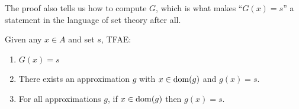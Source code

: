 The proof also tells us how to compute $G$, which is what makes ``$G(x) = s$'' a statement in the language of set theory after all.

\begin{boxlemma}
    Given any $x \in A$ and set $s$, TFAE:
    \begin{enumerate}
        \item $G(x) = s$
        \item There exists an approximation $g$ with $x \in \operatorname{dom}\!\left( g \right)$ and $g(x) = s$.
        \item For all approximations $g$, if $x \in \operatorname{dom}\!\left( g \right)$ then $g(x) = s$.
    \end{enumerate}
\end{boxlemma}
